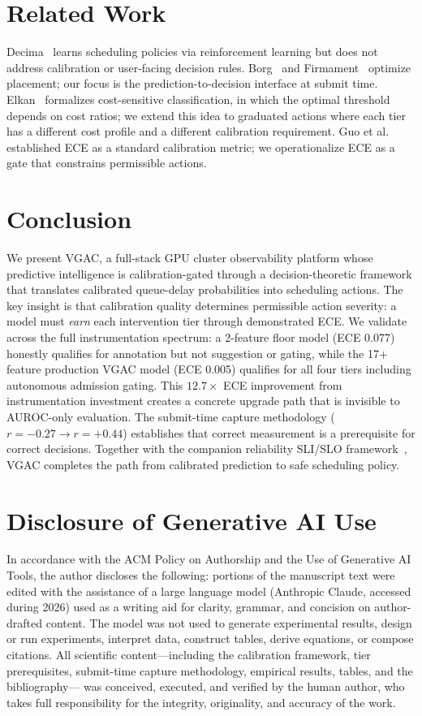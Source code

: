 \documentclass[sigconf]{acmart}
\begin{document}
\section{Related Work}
Decima~\cite{decima} learns scheduling policies via reinforcement learning but does not address calibration or user-facing decision rules. Borg~\cite{borg} and Firmament~\cite{firmament} optimize placement; our focus is the prediction-to-decision interface at submit time. Elkan~\cite{elkan2001} formalizes cost-sensitive classification, in which the optimal threshold depends on cost ratios; we extend this idea to graduated actions where each tier has a different cost profile and a different calibration requirement. Guo et al.~\cite{guo2017calibration} established ECE as a standard calibration metric; we operationalize ECE as a gate that constrains permissible actions.

\section{Conclusion}
We present VGAC, a full-stack GPU cluster observability platform whose predictive intelligence is calibration-gated through a decision-theoretic framework that translates calibrated queue-delay probabilities into scheduling actions. The key insight is that calibration quality determines permissible action severity: a model must \emph{earn} each intervention tier through demonstrated ECE. We validate across the full instrumentation spectrum: a 2-feature floor model (ECE 0.077) honestly qualifies for annotation but not suggestion or gating, while the 17+\,feature production VGAC model (ECE 0.005) qualifies for all four tiers including autonomous admission gating. This $12.7\times$ ECE improvement from instrumentation investment creates a concrete upgrade path that is invisible to AUROC-only evaluation. The submit-time capture methodology ($r = -0.27 \to r = +0.44$) establishes that correct measurement is a prerequisite for correct decisions. Together with the companion reliability SLI/SLO framework~\cite{espira2026reliability}, VGAC completes the path from calibrated prediction to safe scheduling policy.

\section*{Disclosure of Generative AI Use}
In accordance with the ACM Policy on Authorship and the Use of Generative
AI Tools, the author discloses the following: portions of the manuscript
text were edited with the assistance of a large language model (Anthropic
Claude, accessed during 2026) used as a writing aid for clarity, grammar,
and concision on author-drafted content. The model was not used to
generate experimental results, design or run experiments, interpret data,
construct tables, derive equations, or compose citations. All scientific
content---including the calibration framework, tier prerequisites,
submit-time capture methodology, empirical results, tables, and the bibliography---
was conceived, executed, and verified by the human author, who takes full
responsibility for the integrity, originality, and accuracy of the work.
\end{document}
